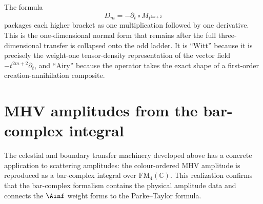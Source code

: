\begin{remark}
\label{rem:cbt-airy-witt-name}
The formula
\[
D_m=-\partial_t\circ M_{t^{2m+2}}
\]
packages each higher bracket as one multiplication followed by one derivative. This is the one-dimensional normal form that remains after the full three-dimensional transfer is collapsed onto the odd ladder. It is ``Witt'' because it is precisely the weight-one tensor-density representation of the vector field $-t^{2m+2}\partial_t$, and ``Airy'' because the operator takes the exact shape of a first-order creation-annihilation composite.
\end{remark}


\section{MHV amplitudes from the bar-complex integral}
\label{sec:cbt-mhv-bar-complex}

The celestial and boundary transfer machinery developed above has a concrete application to scattering amplitudes: the colour-ordered MHV amplitude is reproduced as a bar-complex integral over $\overline{\mathrm{FM}}_4(\mathbb{C})$. This realization confirms that the bar-complex formalism contains the physical amplitude data and connects the $\Ainf$ weight forms to the Parke--Taylor formula.

